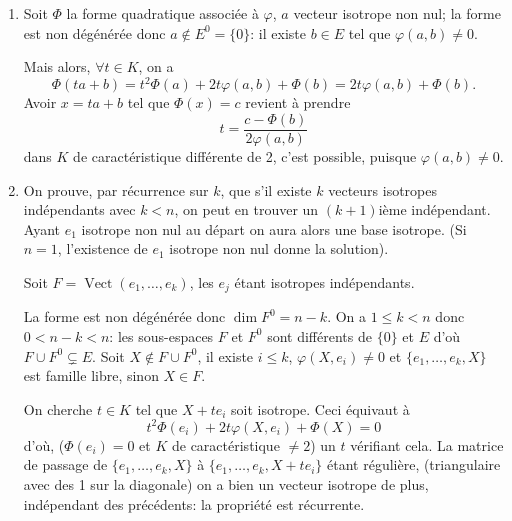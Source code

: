 \begin{enumerate}[label=\arabic*.,leftmargin=2.2em,itemsep=1.1em]
En posant $X=x-y-z$, $Y=y-z$ et $Z=y+z$, on obtient les formes coordonnées dans une nouvelle base $(I,J,K)$, la matrice de passage $P$ étant telle que
\[
P^{-1}=
\begin{pmatrix}
1&-1&-1\\
0&1&-1\\
0&1&1
\end{pmatrix}
\qquad\text{d'où}\qquad
P=
\begin{pmatrix}
1&0&1\\
0&\tfrac12&\tfrac12\\
0&-\tfrac12&\tfrac12
\end{pmatrix},
\]
les colonnes de $P$ donnent les composantes de $I,J,K$, vecteurs d'une base conjuguée, dans la base initiale. Dans cette base conjuguée, la forme quadratique s'écrit $X^2+Y^2-Z^2$.

\item Soit $\Phi$ la forme quadratique associée à $\varphi$, $a$ vecteur isotrope non nul; la forme est non dégénérée donc $a\notin E^0=\{0\}$: il existe $b\in E$ tel que $\varphi(a,b)\ne0$.

Mais alors, $\forall t\in K$, on a
\[
\Phi(ta+b)=t^2\Phi(a)+2t\varphi(a,b)+\Phi(b)=2t\varphi(a,b)+\Phi(b).
\]
Avoir $x=ta+b$ tel que $\Phi(x)=c$ revient à prendre
\[
t=\frac{c-\Phi(b)}{2\varphi(a,b)}
\]
dans $K$ de caractéristique différente de 2, c'est possible, puisque $\varphi(a,b)\ne0$.

\item On prouve, par récurrence sur $k$, que s'il existe $k$ vecteurs isotropes indépendants avec $k<n$, on peut en trouver un $(k+1)$ième indépendant. Ayant $e_1$ isotrope non nul au départ on aura alors une base isotrope. (Si $n=1$, l'existence de $e_1$ isotrope non nul donne la solution).

Soit $F=\operatorname{Vect}(e_1,\ldots,e_k)$, les $e_j$ étant isotropes indépendants.

La forme est non dégénérée donc $\dim F^0=n-k$. On a $1\le k<n$ donc $0<n-k<n$: les sous-espaces $F$ et $F^0$ sont différents de $\{0\}$ et $E$ d'où $F\cup F^0\subsetneq E$. Soit $X\notin F\cup F^0$, il existe $i\le k$, $\varphi(X,e_i)\ne0$ et $\{e_1,\ldots,e_k,X\}$ est famille libre, sinon $X\in F$.

On cherche $t\in K$ tel que $X+te_i$ soit isotrope. Ceci équivaut à
\[
t^2\Phi(e_i)+2t\varphi(X,e_i)+\Phi(X)=0
\]
d'où, ($\Phi(e_i)=0$ et $K$ de caractéristique $\ne2$) un $t$ vérifiant cela. La matrice de passage de $\{e_1,\ldots,e_k,X\}$ à $\{e_1,\ldots,e_k,X+te_i\}$ étant régulière, (triangulaire avec des 1 sur la diagonale) on a bien un vecteur isotrope de plus, indépendant des précédents: la propriété est récurrente.


\end{enumerate}
